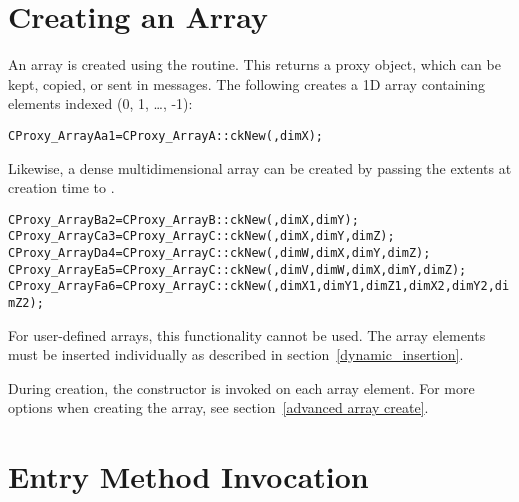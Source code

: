 \section{Creating an Array}
\label{basic array creation}

An array is created using the  routine. This returns a
proxy object, which can be kept, copied, or sent in messages. The following
creates a 1D array containing elements indexed (0, 1, \ldots,
-1):
%
\begin{alltt}
CProxy_ArrayA a1 = CProxy_ArrayA::ckNew(, dimX);
\end{alltt}
%
Likewise, a dense multidimensional array can be created by passing the extents
at creation time to .
%
\begin{alltt}
CProxy_ArrayB a2 = CProxy_ArrayB::ckNew(, dimX, dimY);
CProxy_ArrayC a3 = CProxy_ArrayC::ckNew(, dimX, dimY, dimZ);
CProxy_ArrayD a4 = CProxy_ArrayC::ckNew(, dimW, dimX, dimY, dimZ);
CProxy_ArrayE a5 = CProxy_ArrayC::ckNew(, dimV, dimW, dimX, dimY, dimZ);
CProxy_ArrayF a6 = CProxy_ArrayC::ckNew(, dimX1, dimY1, dimZ1, dimX2, dimY2, dimZ2);
\end{alltt}
%
For user-defined arrays, this functionality cannot be used.  The
array elements must be inserted individually as described in
section~\ref{dynamic_insertion}.

During creation, the constructor is invoked on each array element. For more
options when creating the array, see section~\ref{advanced array create}.

\section{Entry Method Invocation}

